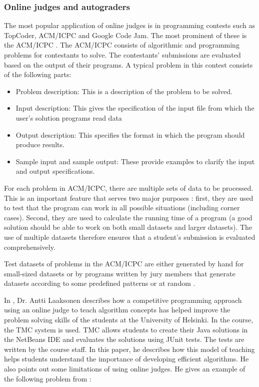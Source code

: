 \documentclass[12pt]{article}
\begin{document}
		\subsubsection{Online judges and autograders}
		The most popular application of online judges is in programming contests such as TopCoder, ACM/ICPC and Google Code Jam. The most prominent of these is the ACM/ICPC \cite{icpc}. The ACM/ICPC consists of algorithmic and programming problems for contestants to solve. The contestants' submissions are evaluated based on the output of their programs. A typical problem in this contest consists of the following parts:
		\begin{itemize}
			\item Problem description: This is a description of the problem to be solved.
			\item  Input description: This gives the specification of the input file from which the user’s
				solution programs read data
			\item Output description: This specifies the format in which the program should produce
				results.
			\item Sample input and sample output: These provide examples to clarify the input and output
				specifications.
		\end{itemize}

		For each problem in ACM/ICPC, there are multiple sets of data to be processed. This is an important feature that serves two major purposes \cite{ojpot}: first, they are used to test that the program can work in all possible situations (including corner cases). Second, they are used to calculate the running time of a program (a good solution should be able to work on both small datasets and larger datasets). The use of multiple datasets therefore ensures that a student’s submission is evaluated comprehensively. 
		
		Test datasets of problems in the ACM/ICPC are either generated by hand for small-sized datasets or by programs written by jury members that generate datasets according to some predefined patterns or at random \cite{budzalov}.
		
		In \cite{anti}, Dr. Antti Laaksonen describes how a competitive programming approach using an online judge to teach algorithm concepts has helped improve the problem solving skills of the students at the University of Helsinki. In 		the course, the TMC system \cite{tmc} is used. TMC allows students to create their Java solutions in the NetBeans IDE and evaluates the solutions using JUnit tests. The tests are written by the course staff. In this paper, he describes how this model of teaching helps students understand the importance of developing efficient algorithms. He also points out some limitations of using online judges. He gives an example of the following problem from \cite{clrs}:
		
\end{document}
